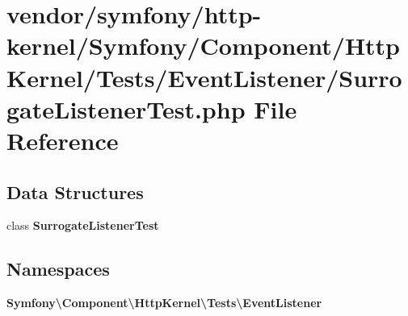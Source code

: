 \section{vendor/symfony/http-\/kernel/\+Symfony/\+Component/\+Http\+Kernel/\+Tests/\+Event\+Listener/\+Surrogate\+Listener\+Test.php File Reference}
\label{_surrogate_listener_test_8php}
\subsection*{Data Structures}
\begin{DoxyCompactItemize}
\item 
class {\bf Surrogate\+Listener\+Test}
\end{DoxyCompactItemize}
\subsection*{Namespaces}
\begin{DoxyCompactItemize}
\item 
 {\bf Symfony\textbackslash{}\+Component\textbackslash{}\+Http\+Kernel\textbackslash{}\+Tests\textbackslash{}\+Event\+Listener}
\end{DoxyCompactItemize}
